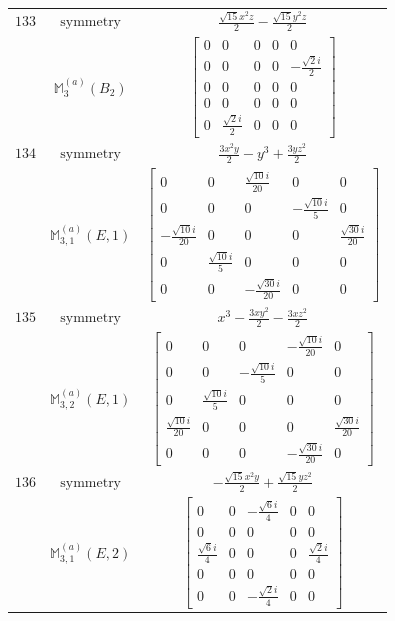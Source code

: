 \documentclass[fleqn,8pt,landscape]{jsarticle}
\begin{document}
\begin{longtable}{ccc}
$ 133 $ & $ \text{symmetry} $ & $ \frac{\sqrt{15} x^{2} z}{2} - \frac{\sqrt{15} y^{2} z}{2} $ \\
$  $ & $ \mathbb{M}_{3}^{(a)}(B_{2}) $ & $ \begin{bmatrix} 0 & 0 & 0 & 0 & 0 \\ 0 & 0 & 0 & 0 & - \frac{\sqrt{2} i}{2} \\ 0 & 0 & 0 & 0 & 0 \\ 0 & 0 & 0 & 0 & 0 \\ 0 & \frac{\sqrt{2} i}{2} & 0 & 0 & 0 \end{bmatrix} $ \\ \hline
$ 134 $ & $ \text{symmetry} $ & $ \frac{3 x^{2} y}{2} - y^{3} + \frac{3 y z^{2}}{2} $ \\
$  $ & $ \mathbb{M}_{3,1}^{(a)}(E,1) $ & $ \begin{bmatrix} 0 & 0 & \frac{\sqrt{10} i}{20} & 0 & 0 \\ 0 & 0 & 0 & - \frac{\sqrt{10} i}{5} & 0 \\ - \frac{\sqrt{10} i}{20} & 0 & 0 & 0 & \frac{\sqrt{30} i}{20} \\ 0 & \frac{\sqrt{10} i}{5} & 0 & 0 & 0 \\ 0 & 0 & - \frac{\sqrt{30} i}{20} & 0 & 0 \end{bmatrix} $ \\ \hline
$ 135 $ & $ \text{symmetry} $ & $ x^{3} - \frac{3 x y^{2}}{2} - \frac{3 x z^{2}}{2} $ \\
$  $ & $ \mathbb{M}_{3,2}^{(a)}(E,1) $ & $ \begin{bmatrix} 0 & 0 & 0 & - \frac{\sqrt{10} i}{20} & 0 \\ 0 & 0 & - \frac{\sqrt{10} i}{5} & 0 & 0 \\ 0 & \frac{\sqrt{10} i}{5} & 0 & 0 & 0 \\ \frac{\sqrt{10} i}{20} & 0 & 0 & 0 & \frac{\sqrt{30} i}{20} \\ 0 & 0 & 0 & - \frac{\sqrt{30} i}{20} & 0 \end{bmatrix} $ \\ \hline
$ 136 $ & $ \text{symmetry} $ & $ - \frac{\sqrt{15} x^{2} y}{2} + \frac{\sqrt{15} y z^{2}}{2} $ \\
$  $ & $ \mathbb{M}_{3,1}^{(a)}(E,2) $ & $ \begin{bmatrix} 0 & 0 & - \frac{\sqrt{6} i}{4} & 0 & 0 \\ 0 & 0 & 0 & 0 & 0 \\ \frac{\sqrt{6} i}{4} & 0 & 0 & 0 & \frac{\sqrt{2} i}{4} \\ 0 & 0 & 0 & 0 & 0 \\ 0 & 0 & - \frac{\sqrt{2} i}{4} & 0 & 0 \end{bmatrix} $ \\ \hline

\end{longtable}
\end{document}
